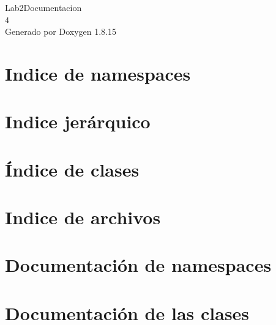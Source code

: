 \let\mypdfximage\pdfximage\def\pdfximage{\immediate\mypdfximage}\documentclass[twoside]{book}
\newcommand{\+}{\discretionary{\mbox{\scriptsize$\hookleftarrow$}}{}{}}
\newcommand{\clearemptydoublepage}{%
  \newpage{\pagestyle{empty}\cleardoublepage}%
}
\begin{document}
\hypersetup{pageanchor=false,
             bookmarksnumbered=true,
             pdfencoding=unicode
            }
\begin{titlepage}
\vspace*{7cm}
\begin{center}%
{\Large Lab2\+Documentacion \\[1ex]\large 4 }\\
\vspace*{1cm}
{\large Generado por Doxygen 1.8.15}\\
\end{center}
\end{titlepage}
\clearemptydoublepage
{}
\tableofcontents
\clearemptydoublepage
{}
\hypersetup{pageanchor=true}

\chapter{Indice de namespaces}

\chapter{Indice jerárquico}

\chapter{Índice de clases}

\chapter{Indice de archivos}

\chapter{Documentación de namespaces}



\chapter{Documentación de las clases}












\end{document}
